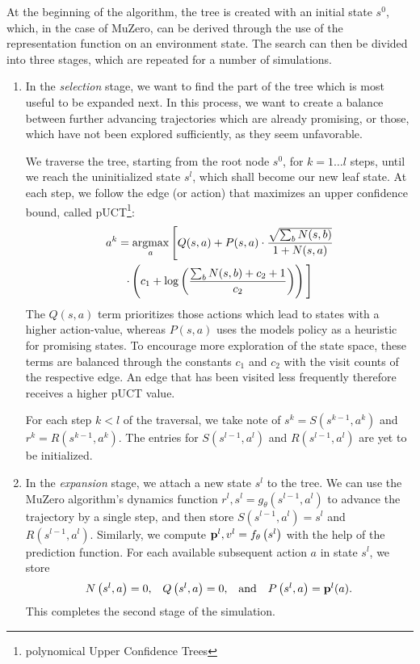 At the beginning of the algorithm, the tree is created with an initial state $s^0$, which, in the case of MuZero, can be derived through the use of the representation function on an environment state. The search can then be divided into three stages, which are repeated for a number of simulations.
\begin{enumerate}
    \item In the \textit{selection} stage, we want to find the part of the tree which is most useful to be expanded next. In this process, we want to create a balance between further advancing trajectories which are already promising, or those, which have not been explored sufficiently, as they seem unfavorable.

    We traverse the tree, starting from the root node $s^0$, for $k=1 \dots l$ steps, until we reach the uninitialized state $s^l$, which shall become our new leaf state. At each step, we follow the edge (or action) that maximizes an upper confidence bound, called pUCT\footnote{polynomical Upper Confidence Trees}:
    \begin{multline*}
        a^k = \argmax_a \Bigg[
            Q(s, a) +
            P(s, a) \cdot
            \frac{\sqrt{\sum_b N(s,b)}}{1 + N(s, a)} \\
            \cdot \left(
                c_1 + \log \left(
                    \frac{\sum_b N(s, b) + c_2 + 1}{c_2}
                \right)
            \right)
        \Bigg]
    \end{multline*}
    The $Q(s, a)$ term prioritizes those actions which lead to states with a higher action-value, whereas $P(s, a)$ uses the models policy as a heuristic for promising states. To encourage more exploration of the state space, these terms are balanced through the constants $c_1$ and $c_2$ with the visit counts of the respective edge. An edge that has been visited less frequently therefore receives a higher pUCT value.

    For each step $k < l$ of the traversal, we take note of $s^k = S \left(s^{k-1}, a^k \right)$ and $r^k = R \left(s^{k-1}, a^k \right)$. The entries for $S \left(s^{l-1}, a^l \right)$ and $R \left(s^{l-1}, a^l \right)$ are yet to be initialized.

    \item In the \textit{expansion} stage, we attach a new state $s^l$ to the tree. We can use the MuZero algorithm's dynamics function $r^l, s^l = g_\theta \left(s^{l-1}, a^l\right)$ to advance the trajectory by a single step, and then store $S \left( s^{l-1}, a^l\right) = s^l$ and $R \left(s^{l-1}, a^l \right)$. Similarly, we compute $\text{\textbf{p}}^l, v^l = f_\theta \left(s^l\right)$ with the help of the prediction function. For each available subsequent action $a$ in state $s^l$, we store
    \begin{equation*}
        \begin{array}{cccc}
            N \left(s^l, a \right) = 0, &
            Q \left(s^l, a \right) = 0, &
            \text{and} &
            P \left(s^l, a \right) = \text{\textbf{p}}^l(a).
        \end{array}
    \end{equation*}
    This completes the second stage of the simulation.


\end{enumerate}
